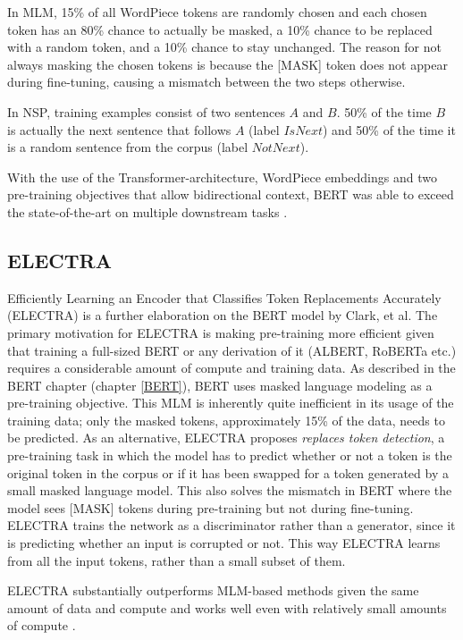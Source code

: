 In MLM, 15\% of all WordPiece tokens are randomly chosen and each chosen token has an 80\% chance to actually be masked, a 10\% chance to be replaced with a random token, and a 10\% chance to stay unchanged.
The reason for not always masking the chosen tokens is because the [MASK] token does not appear during fine-tuning, causing a mismatch between the two steps otherwise.

In NSP, training examples consist of two sentences $A$ and $B$.
50\% of the time $B$ is actually the next sentence that follows $A$ (label $IsNext$) and 50\% of the time it is a random sentence from the corpus (label $NotNext$).

With the use of the Transformer-architecture, WordPiece embeddings and two pre-training objectives that allow bidirectional context, BERT was able to exceed the state-of-the-art on multiple downstream tasks \cite{devlin2019}.

\subsection{ELECTRA} \label{ELECTRA}
Efficiently Learning an Encoder that Classifies Token Replacements Accurately (ELECTRA) is a further elaboration on the BERT model by Clark, et al. \cite{clark2020}
The primary motivation for ELECTRA is making pre-training more efficient given that training a full-sized BERT or any derivation of it (ALBERT, RoBERTa etc.) requires a considerable amount of compute and training data.
As described in the BERT chapter (chapter \ref{BERT}), BERT uses masked language modeling as a pre-training objective.
This MLM is inherently quite inefficient in its usage of the training data; only the masked tokens, approximately 15\% of the data, needs to be predicted.
As an alternative, ELECTRA proposes \textit{replaces token detection}, a pre-training task in which the model has to predict whether or not a token is the original token in the corpus or if it has been swapped for a token generated by a small masked language model.
This also solves the mismatch in BERT where the model sees [MASK] tokens during pre-training but not during fine-tuning.
ELECTRA trains the network as a discriminator rather than a generator, since it is predicting whether an input is corrupted or not.
This way ELECTRA learns from all the input tokens, rather than a small subset of them.

ELECTRA substantially outperforms MLM-based methods given the same amount of data and compute and works well even with relatively small amounts of compute \cite{clark2020}.
